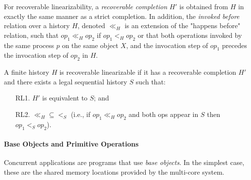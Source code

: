 For recoverable linearizability, a \textit{recoverable completion} $H'$ is obtained from $H$ in exactly the same manner as a strict completion. In addition, the \textit{invoked before} relation over a history $H$, denoted $\ll_H$ is an extension of the "happens before" relation, such that $op_1 \ll_H op_2$ if $op_1 <_H op_2$ or that both operations invoked by the same process $p$ on the same object $X$, and the invocation step of $op_1$ precedes the invocation step of $op_2$ in $H$.

\begin{definition} 
	\label{Definition: Recoverable linearizability}
	A finite history $H$ is recoverable linearizable if it has a recoverable completion $H'$ and there exists a legal sequential history $S$ such that:
	\begin{enumerate}
		\item [RL1.] $H'$ is equivalent to $S$; and
		\item [RL2.] $\ll_H \subseteq <_S$ (i.e., if $op_1 \ll_H op_2$ and both ops appear in $S$ then $op_1 <_S op_2$).
	\end{enumerate}
\end{definition}





\paragraph{Base Objects and Primitive Operations}
Concurrent applications are programs that use \emph{base objects}.
In the simplest case, these are the shared memory locations provided by the multi-core system.

